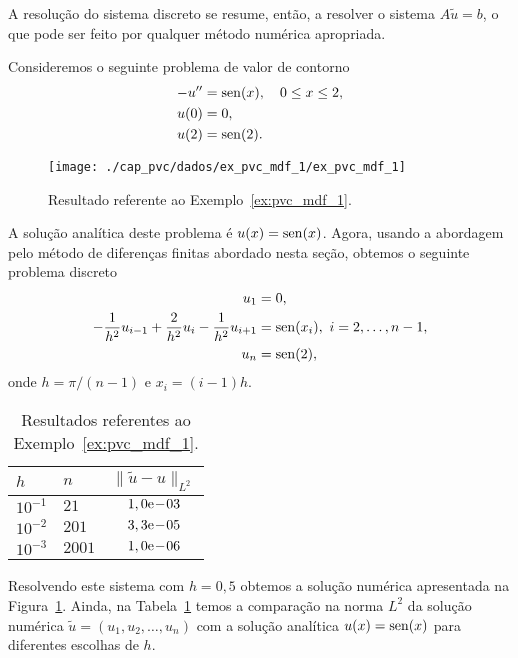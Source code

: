 A resolução do sistema discreto se resume, então, a resolver o sistema $A\tilde{u} = b$, o que pode ser feito por qualquer método numérica apropriada.


\begin{ex}\label{ex:pvc_mdf_1}
  Consideremos o seguinte problema de valor de contorno
  \begin{align}
    -u'' &= \operatorname{sen}(x),\quad 0\leq x \leq 2,\\
    u(0) &= 0,\\
    u(2) &= \operatorname{sen}(2).
  \end{align}

\begin{figure}[h!]
  \centering
  \texttt{[image: ./cap\_pvc/dados/ex\_pvc\_mdf\_1/ex\_pvc\_mdf\_1]}
  \caption{Resultado referente ao Exemplo~\ref{ex:pvc_mdf_1}.}
  \label{fig:ex_pvc_mdf_1}
\end{figure}

A solução analítica deste problema é $u(x) = \operatorname{sen}(x)$. Agora, usando a abordagem pelo método de diferenças finitas abordado nesta seção, obtemos o seguinte problema discreto
\begin{align}
  u_1 &= 0,\\
  -\frac{1}{h^2}u_{i-1} + \frac{2}{h^2}u_i - \frac{1}{h^2}u_{i+1} &= \operatorname{sen}(x_i),~i=2, \dotsc, n-1,\\
  u_n &= \operatorname{sen}(2),
\end{align}
onde $h=\pi/(n-1)$ e $x_i = (i-1)h$.

\begin{table}[h!]
  \centering
  \begin{tabular}{ll|c}
    $h$ & $n$ & $\|\tilde{u} - u\|_{L^2}$ \\\hline
    $10^{-1}$ & $21$ & $1,0\mathrm{e}\!-\!03$ \\
    $10^{-2}$ & $201$ & $3,3\mathrm{e}\!-\!05$ \\
    $10^{-3}$ & $2001$ & $1,0\mathrm{e}\!-\!06$ \\\hline
  \end{tabular}
  \caption{Resultados referentes ao Exemplo~\ref{ex:pvc_mdf_1}.}
  \label{tab:ex_pvc_mdf_1}
\end{table}

Resolvendo este sistema com $h=0,5$ obtemos a solução numérica apresentada na Figura~\ref{fig:ex_pvc_mdf_1}. Ainda, na Tabela~\ref{tab:ex_pvc_mdf_1} temos a comparação na norma $L^2$ da solução numérica $\tilde{u} = (u_1, u_2, \dotsc, u_n)$ com a solução analítica $u(x)=\operatorname{sen}(x)$ para diferentes escolhas de $h$.


\end{ex}
